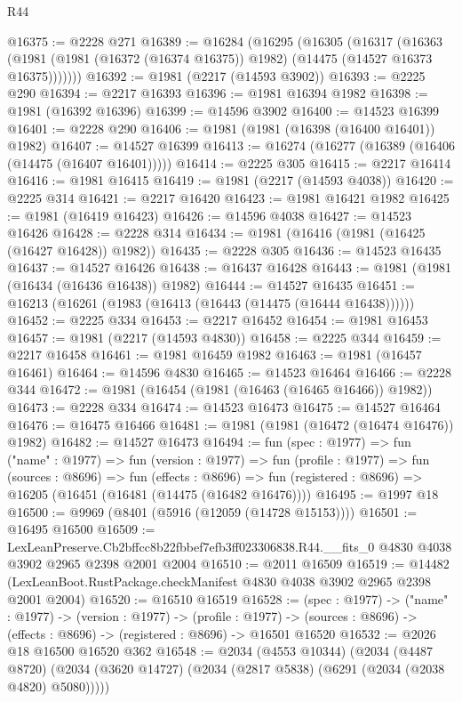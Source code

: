 \begin{lexlean}{R44}
\begin{coremodule}
@16375 := @2228 @271
@16389 := @16284
    (@16295
      (@16305
        (@16317
          (@16363 (@1981 (@1981 (@16372 (@16374 @16375)) @1982) (@14475 (@14527 @16373 @16375)))))))
@16392 := @1981 (@2217 (@14593 @3902))
@16393 := @2225 @290
@16394 := @2217 @16393
@16396 := @1981 @16394 @1982
@16398 := @1981 (@16392 @16396)
@16399 := @14596 @3902
@16400 := @14523 @16399
@16401 := @2228 @290
@16406 := @1981 (@1981 (@16398 (@16400 @16401)) @1982)
@16407 := @14527 @16399
@16413 := @16274 (@16277 (@16389 (@16406 (@14475 (@16407 @16401)))))
@16414 := @2225 @305
@16415 := @2217 @16414
@16416 := @1981 @16415
@16419 := @1981 (@2217 (@14593 @4038))
@16420 := @2225 @314
@16421 := @2217 @16420
@16423 := @1981 @16421 @1982
@16425 := @1981 (@16419 @16423)
@16426 := @14596 @4038
@16427 := @14523 @16426
@16428 := @2228 @314
@16434 := @1981 (@16416 (@1981 (@16425 (@16427 @16428)) @1982))
@16435 := @2228 @305
@16436 := @14523 @16435
@16437 := @14527 @16426
@16438 := @16437 @16428
@16443 := @1981 (@1981 (@16434 (@16436 @16438)) @1982)
@16444 := @14527 @16435
@16451 := @16213 (@16261 (@1983 (@16413 (@16443 (@14475 (@16444 @16438))))))
@16452 := @2225 @334
@16453 := @2217 @16452
@16454 := @1981 @16453
@16457 := @1981 (@2217 (@14593 @4830))
@16458 := @2225 @344
@16459 := @2217 @16458
@16461 := @1981 @16459 @1982
@16463 := @1981 (@16457 @16461)
@16464 := @14596 @4830
@16465 := @14523 @16464
@16466 := @2228 @344
@16472 := @1981 (@16454 (@1981 (@16463 (@16465 @16466)) @1982))
@16473 := @2228 @334
@16474 := @14523 @16473
@16475 := @14527 @16464
@16476 := @16475 @16466
@16481 := @1981 (@1981 (@16472 (@16474 @16476)) @1982)
@16482 := @14527 @16473
@16494 := fun (spec : @1977) =>
  fun ("name" : @1977) =>
  fun (version : @1977) =>
  fun (profile : @1977) =>
  fun (sources : @8696) =>
  fun (effects : @8696) =>
  fun (registered : @8696) => @16205 (@16451 (@16481 (@14475 (@16482 @16476))))
@16495 := @1997 @18
@16500 := @9969 (@8401 (@5916 (@12059 (@14728 @15153))))
@16501 := @16495 @16500
@16509 := LexLeanPreserve.Cb2bffcc8b22fbbef7efb3ff023306838.R44.__fits_0
    @4830
    @4038
    @3902
    @2965
    @2398
    @2001
    @2004
@16510 := @2011 @16509
@16519 := @14482 (LexLeanBoot.RustPackage.checkManifest @4830 @4038 @3902 @2965 @2398 @2001 @2004)
@16520 := @16510 @16519
@16528 := (spec : @1977) ->
  ("name" : @1977) ->
  (version : @1977) ->
  (profile : @1977) ->
  (sources : @8696) -> (effects : @8696) -> (registered : @8696) -> @16501 @16520
@16532 := @2026 @18 @16500 @16520 @362
@16548 := @2034
    (@4553 @10344)
    (@2034
      (@4487 @8720)
      (@2034 (@3620 @14727) (@2034 (@2817 @5838) (@6291 (@2034 (@2038 @4820) @5080)))))

\end{coremodule}
\end{lexlean}
